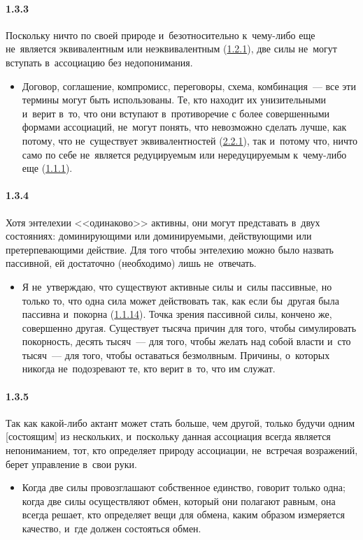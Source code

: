 \paragraph{1.3.3}\hypertarget{par:1.3.3}{} Поскольку ничто по своей природе и~безотносительно к~чему-либо еще не~является эквивалентным или неэквивалентным (\hyperlink{par:1.2.1}{1.2.1}), две силы не~могут вступать в~ассоциацию без недопонимания. 
	\begin{itemize}
	\item Договор, соглашение, компромисс, переговоры, схема, комбинация~--- все эти термины могут быть использованы. Те, кто находит их унизительными и~верит в~то, что они вступают в~противоречие с более совершенными формами ассоциаций, не~могут понять, что невозможно сделать лучше, как потому, что не~существует эквивалентностей (\hyperlink{par:2.2.1}{2.2.1}), так и~потому что, ничто само по себе не~является редуцируемым или нередуцируемым к~чему-либо еще (\hyperlink{par:1.1.1}{1.1.1}).
	\end{itemize}

\paragraph{1.3.4}\hypertarget{par:1.3.4}{} Хотя энтелехии <<одинаково>> активны, они могут представать в~двух состояниях: доминирующими или доминируемыми, действующими или претерпевающими действие. Для того чтобы энтелехию можно было назвать пассивной, ей достаточно (необходимо) лишь не~отвечать.
	\begin{itemize}
	\item Я не~утверждаю, что существуют активные силы и~силы пассивные, но только то, что одна сила может действовать так, как если бы~другая была пассивна и~покорна (\hyperlink{par:1.1.14}{1.1.14}). Точка зрения пассивной силы, кончено же, совершенно другая. Существует тысяча причин для того, чтобы симулировать покорность, десять тысяч~--- для того, чтобы желать над собой власти и~сто тысяч~--- для того, чтобы оставаться безмолвным. Причины, о~которых никогда не~подозревают те, кто верит в~то, что им служат.
	\end{itemize}

\paragraph{1.3.5}\hypertarget{par:1.3.5}{} Так как какой-либо актант может стать больше, чем другой, только будучи одним [состоящим] из нескольких, и~поскольку данная ассоциация всегда является непониманием, тот, кто определяет природу ассоциации, не~встречая возражений, берет управление в~свои руки. 
	\begin{itemize}
	\item Когда две силы провозглашают собственное единство, говорит только одна; когда две силы осуществляют обмен, который они полагают равным, она всегда решает, кто определяет вещи для обмена, каким образом измеряется качество, и~где должен состояться обмен.
	\end{itemize}

